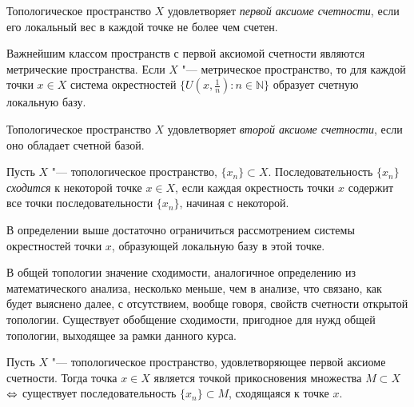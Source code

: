 \begin{definition}
    Топологическое пространство $X$ удовлетворяет \textit{первой аксиоме счетности}, если его локальный вес в каждой точке не более чем счетен.
\end{definition}

\begin{note}
    Важнейшим классом пространств с первой аксиомой счетности являются метрические пространства. Если $X$ "--- метрическое пространство, то для каждой точки $x \in X$ система окрестностей $\{U(x, \frac 1n): n\in\mathbb{N}\}$ образует счетную локальную базу.
\end{note}

\begin{definition}
    Топологическое пространство $X$ удовлетворяет \textit{второй аксиоме счетности}, если оно обладает счетной базой.
\end{definition}

\begin{definition}
    Пусть $X$ "--- топологическое пространство, $\{x_n\} \subset X$. Последовательность $\{x_n\}$ \textit{сходится} к некоторой точке $x \in X$, если каждая окрестность точки $x$ содержит все точки последовательности $\{x_n\}$, начиная с некоторой.
\end{definition}

\begin{note}
    В определении выше достаточно ограничиться рассмотрением системы окре\-стностей точки $x$, образующей локальную базу в этой точке.
\end{note}

\begin{note}
    В общей топологии значение сходимости, аналогичное определению из математического анализа, несколько меньше, чем в анализе, что связано, как будет выяснено далее, с отсутствием, вообще говоря, свойств счетности открытой топологии. Существует обобщение сходимости, пригодное для нужд общей топологии, выходящее за рамки данного курса.
\end{note}

\begin{proposition}\label{propfrecheturysohn}
    Пусть $X$ "--- топологическое пространство, удовлетворяющее первой аксиоме счетности. Тогда точка $x \in X$ является точкой прикосновения множества $M \subset X$ $\Leftrightarrow$ существует последовательность $\{x_n\} \subset M$, сходящаяся к точке $x$.
\end{proposition}


